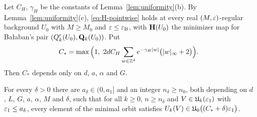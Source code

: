Let $C_H$, $\gamma_H$ be the constants of Lemma~\ref{lem:uniformity}(b). By Lemma~\ref{lem:uniformity}(c), \eqref{eq:H-pointwise} holds at every real $(M,\varepsilon)$-regular background $U_0$ with $M\ge M_0$ and $\varepsilon\le\varepsilon_{\rm B}$, with $\mathbf H(U_0)$ the minimizer map for Ba\l aban's pair $(Q'_k(U_0),\mathbf Q_k(U_0))$. Put
\[
C_*=\max\Big(1,\ 2dC_H\sum_{w\in\Z^d}e^{-\gamma_H|w|}\big(|w|_\infty+2\big)\Big).
\]
Then $C_*$ depends only on $d$, $a$, $\alpha$ and $G$.


\begin{proposition}\label{prop:sharp-curvature}
For every $\delta>0$ there are $a_\delta\in(0,a_1]$ and an integer $n_\delta\ge n_0$, both depending on $d$, $L$, $G$, $a$, $\alpha$, $M$ and $\delta$, such that for all $k\ge0$, $n\ge n_\delta$ and $V\in\mathfrak U_k(\varepsilon_1)$ with $\varepsilon_1\le a_\delta$, every element of the minimal orbit satisfies $U_k(V)\in\mathfrak U_0\big((C_*+\delta)\varepsilon_1\big)$.
\end{proposition}

